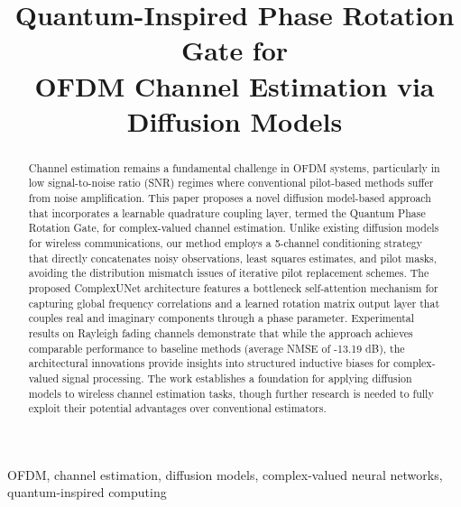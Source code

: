 \documentclass[conference]{IEEEtran}
\begin{document}
\title{Quantum-Inspired Phase Rotation Gate for\\OFDM Channel Estimation via Diffusion Models}

\author{
}

\maketitle

\begin{abstract}
Channel estimation remains a fundamental challenge in OFDM systems, particularly in low signal-to-noise ratio (SNR) regimes where conventional pilot-based methods suffer from noise amplification. This paper proposes a novel diffusion model-based approach that incorporates a learnable quadrature coupling layer, termed the Quantum Phase Rotation Gate, for complex-valued channel estimation. Unlike existing diffusion models for wireless communications, our method employs a 5-channel conditioning strategy that directly concatenates noisy observations, least squares estimates, and pilot masks, avoiding the distribution mismatch issues of iterative pilot replacement schemes. The proposed ComplexUNet architecture features a bottleneck self-attention mechanism for capturing global frequency correlations and a learned rotation matrix output layer that couples real and imaginary components through a phase parameter. Experimental results on Rayleigh fading channels demonstrate that while the approach achieves comparable performance to baseline methods (average NMSE of -13.19 dB), the architectural innovations provide insights into structured inductive biases for complex-valued signal processing. The work establishes a foundation for applying diffusion models to wireless channel estimation tasks, though further research is needed to fully exploit their potential advantages over conventional estimators.
\end{abstract}

\begin{IEEEkeywords}
OFDM, channel estimation, diffusion models, complex-valued neural networks, quantum-inspired computing
\end{IEEEkeywords}
\end{document}
